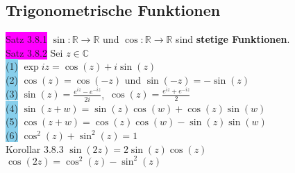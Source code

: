 \documentclass[landscape, 10pt]{article}
\newcommand{\R}{\mathbb{R}}
\newcommand{\C}{\mathbb{C}}
\begin{document}
\begin{multicols}{3}
       \subsection{Trigonometrische Funktionen}
              \colorbox{magenta}{Satz 3.8.1} 
                     \textcolor{NavyBlue}{$\sin:\R\longrightarrow\R$} 
                     und 
                     \textcolor{NavyBlue}{$\cos:\R\longrightarrow\R$} 
                     sind \textbf{stetige Funktionen}.\\
              \colorbox{magenta}{Satz 3.8.2} 
                     Sei \textcolor{NavyBlue}{$z\in\C$}\\
                     \colorbox{SkyBlue}{(1)} 
                            \textcolor{NavyBlue}{$\exp iz=\cos(z)+i\sin(z)$} \\
                     \colorbox{SkyBlue}{(2)} 
                            \textcolor{NavyBlue}{
                            $\cos(z)=\cos(-z)$} und 
                            \textcolor{NavyBlue}{
                            $\sin(-z)=-\sin(z)$}\\
                     \colorbox{SkyBlue}{(3)} 
                            \textcolor{NavyBlue}{
                            $\sin(z)=\frac{e^{iz}-e^{-iz}}{2i}$},\,
                            \textcolor{NavyBlue}{
                            $\cos(z)=\frac{e^{iz}+e^{-iz}}{2}$}\\
                     \colorbox{SkyBlue}{(4)} 
                            \textcolor{NavyBlue}{
                            $\sin(z+w)
                            =\sin(z)\cos(w)+\cos(z)\sin(w)$}\\
                     \colorbox{SkyBlue}{(5)} 
                            \textcolor{NavyBlue}{
                            $\cos(z+w)
                            =\cos(z)\cos(w)-\sin(z)\sin(w)$}\\ 
                     \colorbox{SkyBlue}{(6)} 
                            \textcolor{NavyBlue}{$\cos^2(z)+\sin^2(z)=1$}\\
              \colorbox{BurntOrange}{Korollar 3.8.3} 
                     \textcolor{NavyBlue}{$\sin(2z)=2\sin(z)\cos(z)$}\\
                     \textcolor{NavyBlue}{$\cos(2z)=\cos^2(z)-\sin^2(z)$}

\end{multicols}
\end{document}
